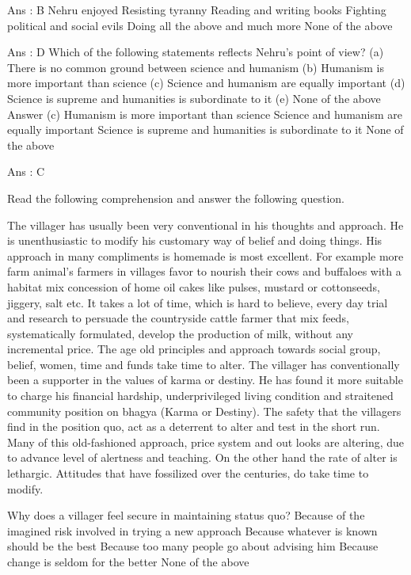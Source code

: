         Ans : B
        Nehru enjoyed
            Resisting tyranny
            Reading and writing books
            Fighting political and social evils
            Doing all the above and much more
            None of the above 

        Ans : D
        Which of the following statements reflects Nehru’s point of view?
            (a) There is no common ground between science and humanism (b) Humanism is more important than science (c) Science and humanism are equally important (d) Science is supreme and humanities is subordinate to it (e) None of the above Answer (c)
            Humanism is more important than science
            Science and humanism are equally important
            Science is supreme and humanities is subordinate to it
            None of the above 

        Ans : C 




Read the following comprehension and answer the following question.

    The villager has usually been very conventional in his thoughts and approach. He is unenthusiastic to modify his customary way of belief and doing things. His approach in many compliments is homemade is most excellent. For example more farm animal’s farmers in villages favor to nourish their cows and buffaloes with a habitat mix concession of home oil cakes like pulses, mustard or cottonseeds, jiggery, salt etc. It takes a lot of time, which is hard to believe, every day trial and research to persuade the countryside cattle farmer that mix feeds, systematically formulated, develop the production of milk, without any incremental price. The age old principles and approach towards social group, belief, women, time and funds take time to alter. The villager has conventionally been a supporter in the values of karma or destiny. He has found it more suitable to charge his financial hardship, underprivileged living condition and straitened community position on bhagya (Karma or Destiny). The safety that the villagers find in the position quo, act as a deterrent to alter and test in the short run. Many of this old-fashioned approach, price system and out looks are altering, due to advance level of alertness and teaching. On the other hand the rate of alter is lethargic. Attitudes that have fossilized over the centuries, do take time to modify.



        Why does a villager feel secure in maintaining status quo?
            Because of the imagined risk involved in trying a new approach
            Because whatever is known should be the best
            Because too many people go about advising him
            Because change is seldom for the better
            None of the above 

